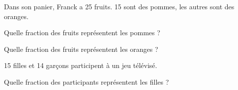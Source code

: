 \documentclass[activite]{thedocument}
\begin{document}
\begin{enumerate}
    \begin{minipage}{0.55\linewidth}
    \vspace{0.5cm}
    \item Dans son panier, Franck a 25 fruits.
    15 sont des pommes, les autres sont des oranges.
    \begin{flushleft}
        Quelle fraction des fruits représentent les pommes ?
    \end{flushleft}
    \begin{flushleft}
        Quelle fraction des fruits représentent les oranges ?
    \end{flushleft}
    \vspace{0.5cm}
    \item 15 filles et 14 garçons participent à un jeu télévisé.
    \begin{flushleft}
        Quelle fraction des participants représentent les filles ?
    \end{flushleft}
    \end{minipage}
    \begin{minipage}{.4\linewidth}
    \begin{center}
    \end{center}
    \end{minipage}
    \end{enumerate}
\end{document}
